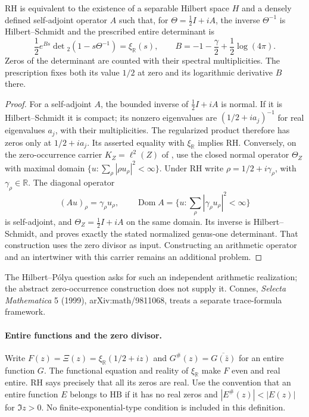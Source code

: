 \begin{theorem}
\label{v4-arith:w5-direct:thm:HP-form}
RH is equivalent to the existence of a separable Hilbert space
$H$ and a densely defined self-adjoint operator $A$ such that, for
$\Theta=\tfrac12I+iA$, the inverse $\Theta^{-1}$ is Hilbert--Schmidt
and the prescribed entire determinant is
\[
 \frac12e^{Bs}\det{}_2(1-s\Theta^{-1})=\xi_{\mathbb R}(s),
 \qquad B=-1-\frac\gamma2+\frac12\log(4\pi).
\]
Zeros of the determinant are counted with their spectral
multiplicities. The prescription fixes both its value $1/2$ at zero
and its logarithmic derivative $B$ there.
\end{theorem}
\begin{proof}
For a self-adjoint $A$, the bounded inverse of $\tfrac12I+iA$
is normal. If it is Hilbert--Schmidt it is compact; its nonzero
eigenvalues are $(1/2+ia_j)^{-1}$ for real eigenvalues $a_j$,
with their multiplicities. The regularized product therefore has
zeros only at $1/2+ia_j$. Its asserted equality with $\xi_{\mathbb R}$
implies RH.
Conversely, on the zero-occurrence carrier $K_Z=\ell^2(Z)$ of
, use the closed normal operator
$\Theta_Z$ with maximal domain
$\{u:\sum_\rho|\rho u_\rho|^2<\infty\}$.
Under RH write $\rho=1/2+i\gamma_\rho$, with $\gamma_\rho\in\mathbb R$.
The diagonal operator
\[
 (Au)_\rho=\gamma_\rho u_\rho,\qquad
 \operatorname{Dom}A=\{u:\sum_\rho|\gamma_\rho u_\rho|^2<\infty\}
\]
is self-adjoint, and $\Theta_Z=\tfrac12I+iA$ on the same domain.
Its inverse is Hilbert--Schmidt, and
 proves exactly the stated
normalized genus-one determinant. That construction uses the zero
divisor as input. Constructing an arithmetic operator and an
intertwiner with this carrier remains an additional problem.
\end{proof}
The Hilbert--P\'olya question asks for such an independent arithmetic
realization; the abstract zero-occurrence construction does not supply
it. Connes, \emph{Selecta Mathematica} 5 (1999), arXiv:math/9811068,
treats a separate trace-formula framework.

\paragraph{Entire functions and the zero divisor.}
Write $F(z)=\Xi(z)=\xi_{\mathbb R}(1/2+iz)$ and
$G^\#(z)=\overline{G(\bar z)}$ for an entire function $G$.
The functional equation and reality of $\xi_{\mathbb R}$ make $F$
even and real entire. RH says precisely that all its zeros are real.
Use the convention that an entire function $E$ belongs to
$\mathrm{HB}$ if it has no real zeros and
$|E^\#(z)|<|E(z)|$ for $\Im z>0$.
No finite-exponential-type condition is included in this definition.

